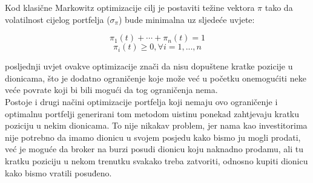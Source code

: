 \documentclass[times, utf8, seminar]{fer}
\begin{document}
Kod klasične Markowitz optimizacije cilj je postaviti težine vektora $\pi$ tako da volatilnost cijelog portfelja ($\sigma_{\pi}$) bude minimalna uz sljedeće uvjete:

\[ \pi_1(t) + \cdots + \pi_n(t) = 1 \]
\[ \pi_i(t) \geq 0, \forall i = 1,...,n \]

posljednji uvjet ovakve optimizacije znači da nisu dopuštene kratke pozicije u dionicama, što je dodatno ograničenje koje može već u početku onemogućiti neke veće povrate koji bi bili mogući da tog ograničenja nema. \\

Postoje i drugi načini optimizacije portfelja koji nemaju ovo ograničenje i optimalnu portfelji generirani tom metodom uistinu ponekad zahtjevaju kratku poziciju u nekim dionicama. To nije nikakav problem, jer nama kao investitorima nije potrebno da imamo dionicu u svojem posjedu kako bismo ju mogli prodati, već je moguće da broker na burzi posudi dionicu koju naknadno prodamu, ali tu kratku poziciju u nekom trenutku svakako treba zatvoriti, odnosno kupiti dionicu kako bismo vratili posuđeno.
\end{document}
